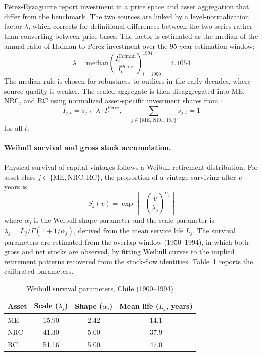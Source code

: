 Pérez-Eyzaguirre report investment in a price space and asset
aggregation that differ from the \citet{Hofman2000a} benchmark. The
two sources are linked by a level-normalization factor $\lambda$,
which corrects for definitional differences between the two series
rather than converting between price bases. The factor is estimated
as the median of the annual ratio of Hofman to Pérez investment over
the 95-year estimation window:
\begin{equation}
	\lambda = \mathrm{median}\!\left(
	\frac{I^{\text{Hofman}}_t}{I^{\text{Pérez}}_t}
	\right)_{t=1900}^{1994}
	= 4.1054
	\label{eq:42:lambda}
\end{equation}
The median rule is chosen for robustness to outliers in the early
decades, where source quality is weaker. The scaled aggregate is
then disaggregated into ME, NRC, and RC using normalized
asset-specific investment shares from \citet{Hofman2000a}:
\begin{equation}
	I_{j,t} = s_{j,t} \cdot \lambda \cdot I^{\text{Pérez}}_t,
	\quad
	\sum_{j \in \{\text{ME},\, \text{NRC},\, \text{RC}\}}
	s_{j,t} = 1
	\label{eq:42:disaggregation}
\end{equation}
for all $t$.

\paragraph{Weibull survival and gross stock accumulation.}
Physical survival of capital vintages follows a Weibull retirement
distribution. For asset class $j \in \{\text{ME}, \text{NRC},
\text{RC}\}$, the proportion of a vintage surviving after $v$ years
is
\begin{equation}
	S_j(v) = \exp\!\left[
	-\left( \frac{v}{\lambda_j} \right)^{\alpha_j}
	\right]
	\label{eq:42:weibull_chile}
\end{equation}
where $\alpha_j$ is the Weibull shape parameter and the scale
parameter is $\lambda_j = L_j / \Gamma(1 + 1/\alpha_j)$, derived
from the mean service life $L_j$. The survival parameters are
estimated from the \citet{Hofman2000b} overlap window
(1950--1994), in which both gross and net stocks are observed, by
fitting Weibull curves to the implied retirement patterns recovered
from the stock-flow identities.
Table~\ref{tab:42:survival_params} reports the calibrated
parameters.

\begin{table}[h]
	\centering
	\caption{Weibull survival parameters, Chile (1900--1994)}
	\label{tab:42:survival_params}
	\begin{tabular}{lccc}
		\toprule
		Asset & Scale ($\lambda_j$) & Shape ($\alpha_j$) & Mean life
		($L_j$, years) \\
		\midrule
		ME  & 15.90 & 2.42 & 14.1 \\
		NRC & 41.30 & 5.00 & 37.9 \\
		RC  & 51.16 & 5.00 & 47.0 \\
		\bottomrule
	\end{tabular}
\end{table}

